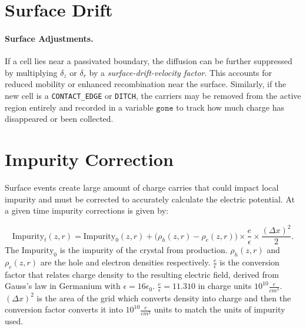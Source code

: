 
\section{Surface Drift}
\paragraph{Surface Adjustments.}
If a cell lies near a passivated boundary, the diffusion can be 
further suppressed by multiplying $\delta_z$ or $\delta_r$ by a 
\emph{surface-drift-velocity factor}. This accounts for reduced mobility 
or enhanced recombination near the surface. Similarly, if the new cell 
is a \texttt{CONTACT\_EDGE} or \texttt{DITCH}, the carriers may be removed 
from the active region entirely and recorded in a variable \(\texttt{gone}\) 
to track how much charge has disappeared or been collected.


\section{Impurity Correction}
Surface events create large amount of charge carries that could impact local impurity and must be corrected to accurately calculate the electric potential. At a given time impurity corrections is given by:

\begin{equation}
  {\text{Impurity}_{t}}(z, r) = \text{Impurity}_{0}(z, r) +
  \bigl( \rho_h(z, r) - \rho_e(z, r) \bigr) \times \frac{e}{\epsilon} \times \frac{(\Delta x)^2}{2}.
\end{equation}
The $\text{Impurity}_{0}$ is the impurity of the crystal from production. $\rho_h(z,r)$ and $\rho_e(z,r)$ are the hole and electron densities respectively. $\frac{e}{\epsilon}$ is the conversion factor that relates charge density to the resulting electric field, derived from Gauss’s law in Germanium with $\epsilon = 16\epsilon_0$. $\frac{e}{\epsilon} = 11.310$ in 
charge units $10^{10}\frac{e}{cm^3}$. $(\Delta x)^2$ is the area of the grid which converts density into charge and then the conversion factor converts it into $10^{10}\frac{e}{cm^3}$ units to match the units of impurity used.


